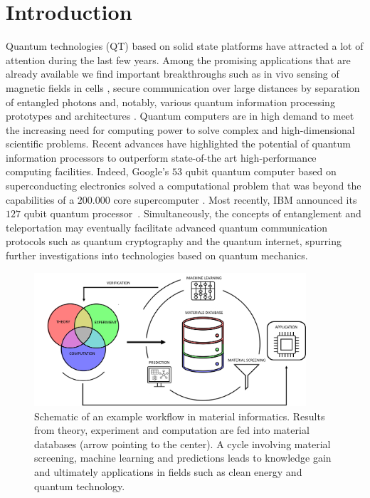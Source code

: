 \documentclass[superscriptaddress,unsortedaddress,
 amsmath,amssymb,
 aps,
]{revtex4-2}
\begin{document}
\section*{Introduction}
Quantum technologies (QT) based on solid state platforms have attracted a lot of attention during the last few years. 
Among the promising applications that are already available we find important breakthroughs such as in vivo sensing of magnetic fields in cells \cite{Lesage_2013}, secure communication over large distances by separation of entangled photons \cite{Ursin2007} and, notably, various quantum information processing prototypes and architectures \cite{Arute_2019}.  
Quantum computers are in high demand to meet the increasing need for computing power to solve complex and high-dimensional scientific problems. 
Recent advances have highlighted the potential of quantum information processors to outperform state-of-the art high-performance computing facilities. Indeed, Google's $53$ qubit quantum computer based on superconducting electronics solved a computational problem that was beyond the capabilities of a $200.000$ core supercomputer \cite{Arute_2019}. Most recently, IBM announced its $127$ qubit quantum processor~\cite{IBM2021}. Simultaneously, the concepts of entanglement and teleportation may eventually facilitate advanced quantum communication protocols such as quantum cryptography and the quantum internet, spurring further investigations into technologies based on quantum mechanics.

\begin{figure}[t]
    \centering
    \includegraphics[width=0.9\textwidth]{figures/ht-workflow-new-2.png}
    \caption{Schematic of an example workflow in material informatics. Results from theory, experiment and computation are fed into material databases (arrow pointing to the center). A cycle involving material screening, machine learning and predictions leads to knowledge gain and ultimately applications in fields such as clean energy and quantum technology. 
    }
    \label{fig:ht-workflow}
\end{figure}
\end{document}
